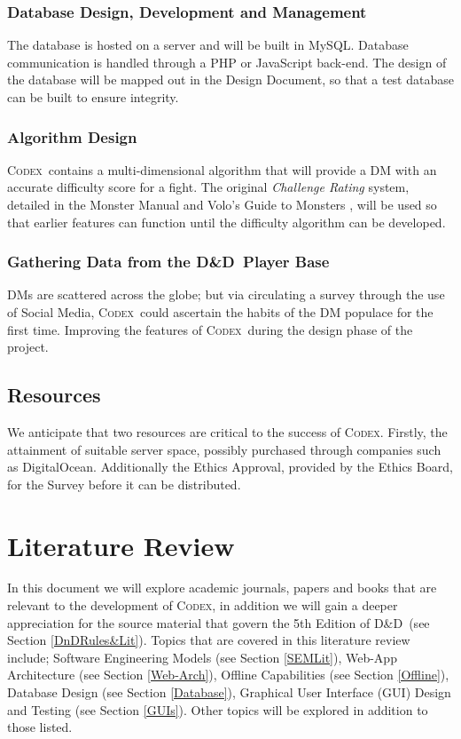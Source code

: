 \documentclass[review]{cmpreport}
\newcommand{\dnd}{D\&D}
\newcommand{\Codex}{\textsc{Codex}}
\begin{document}
	\subsubsection{Database Design, Development and Management}
	The database is hosted on a server and will be built in MySQL. Database communication is handled through a PHP or JavaScript back-end. The design of the database will be mapped out in the Design Document, so that a test database can be built to ensure integrity. 
	
	\subsubsection{Algorithm Design}
	\Codex \ contains a multi-dimensional algorithm that will provide a DM with an accurate difficulty score for a fight. The original \emph{Challenge Rating} system, detailed in the Monster Manual \citep{MonsterManual} and Volo's Guide to Monsters  \citep{Volos}, will be used so that earlier features can function until the difficulty algorithm can be developed. 
	
	\subsubsection{Gathering Data from the \dnd \ Player Base}
	DMs are scattered across the globe; but via circulating a survey through the use of Social Media, \Codex \ could ascertain the habits of the DM populace for the first time. Improving the features of \Codex \ during the design phase of the project.
	
	\subsection{Resources}
	We anticipate that two resources are critical to the success of \Codex. Firstly, the attainment of suitable server space, possibly purchased through companies such as DigitalOcean. Additionally the Ethics Approval, provided by the Ethics Board, for the Survey before it can be distributed. 
	
	\clearpage
	
	\section{Literature Review}
	In this document we will explore academic journals, papers and books that are relevant to the development of \Codex, in addition we will gain a deeper appreciation for the source material that govern the 5th Edition of \dnd \ (see Section \ref{DnDRules&Lit}). Topics that are covered in this literature review include; Software Engineering Models (see Section \ref{SEMLit}), Web-App Architecture (see Section \ref{Web-Arch}), Offline Capabilities (see Section \ref{Offline}), Database Design (see Section \ref{Database}), Graphical User Interface (GUI) Design and Testing (see Section \ref{GUIs}). Other topics will be explored in addition to those listed.
	
\end{document}
